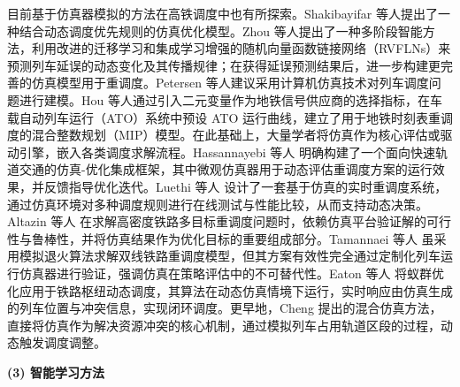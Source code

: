 目前基于仿真器模拟的方法在高铁调度中也有所探索。Shakibayifar 等人\cite{Shakibayifar2017}提出了一种结合动态调度优先规则的仿真优化模型。Zhou 等人\cite{Zhou2021}提出了一种多阶段智能方法，利用改进的迁移学习和集成学习增强的随机向量函数链接网络（RVFLNs）来预测列车延误的动态变化及其传播规律；在获得延误预测结果后，进一步构建更完善的仿真模型用于重调度。Petersen 等人\cite{Petersen2010}建议采用计算机仿真技术对列车调度问题进行建模。Hou 等人\cite{Hou2019}通过引入二元变量作为地铁信号供应商的选择指标，在车载自动列车运行（ATO）系统中预设 ATO 运行曲线，建立了用于地铁时刻表重调度的混合整数规划（MIP）模型。在此基础上，大量学者将仿真作为核心评估或驱动引擎，嵌入各类调度求解流程。Hassannayebi 等人\cite{hassannayebi2021simulation} 明确构建了一个面向快速轨道交通的仿真-优化集成框架，其中微观仿真器用于动态评估重调度方案的运行效果，并反馈指导优化迭代。Luethi 等人\cite{luethi2009structure} 设计了一套基于仿真的实时重调度系统，通过仿真环境对多种调度规则进行在线测试与性能比较，从而支持动态决策。Altazin 等人\cite{altazin2020multi} 在求解高密度铁路多目标重调度问题时，依赖仿真平台验证解的可行性与鲁棒性，并将仿真结果作为优化目标的重要组成部分。Tamannaei 等人\cite{tamannaei2016novel} 虽采用模拟退火算法求解双线铁路重调度模型，但其方案有效性完全通过定制化列车运行仿真器进行验证，强调仿真在策略评估中的不可替代性。Eaton 等人\cite{eaton2017ant} 将蚁群优化应用于铁路枢纽动态调度，其算法在动态仿真情境下运行，实时响应由仿真生成的列车位置与冲突信息，实现闭环调度。更早地，Cheng\cite{cheng1998hybrid} 提出的混合仿真方法，直接将仿真作为解决资源冲突的核心机制，通过模拟列车占用轨道区段的过程，动态触发调度调整。

\textbf{(3) 智能学习方法}


